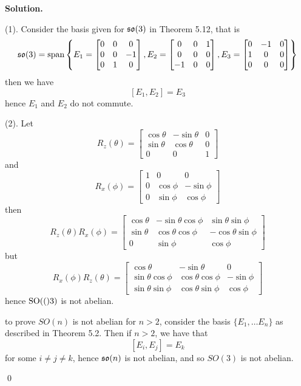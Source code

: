 \documentclass[12pt]{book}
\theoremstyle{definition}
\newenvironment{solution}
{%
  \par\noindent\textbf{Solution.}\quad
}
{%
  \qed\par
}
\begin{document}
\begin{solution}
  (1). Consider the basis given for $\mathfrak{so}(3)$ in Theorem 5.12, that is
  \[\mathfrak{so}(3) = \text{span} \left\{
    E_1 = \begin{bmatrix}
      0 & 0 & 0 \\
      0 & 0 & -1 \\
      0 & 1 & 0
      \end{bmatrix}, 
    E_2 = \begin{bmatrix}
      0 & 0 & 1 \\
      0 & 0 & 0 \\
      -1 & 0 & 0
      \end{bmatrix},
    E_3 = \begin{bmatrix}
      0 & -1 & 0 \\
      1 & 0 & 0 \\
      0 & 0 & 0
      \end{bmatrix} \right\}\]
  then we have 
  \[[E_1, E_2] = E_3\]
  hence $E_1$ and $E_2$ do not commute.

  (2). Let
  \[
    R_z(\theta) =
    \begin{bmatrix}
    \cos\theta & -\sin\theta & 0 \\
    \sin\theta & \cos\theta & 0 \\
    0 & 0 & 1
    \end{bmatrix}
  \]
  and 
  \[
    R_x(\phi) =
    \begin{bmatrix}
    1 & 0 & 0 \\
    0 & \cos\phi & -\sin\phi \\
    0 & \sin\phi & \cos\phi
    \end{bmatrix}
  \]
  then 
  \[
    R_z(\theta) R_x(\phi) =
    \begin{bmatrix}
    \cos\theta & -\sin\theta\cos\phi & \sin\theta\sin\phi \\
    \sin\theta & \cos\theta\cos\phi & -\cos\theta\sin\phi \\
    0 & \sin\phi & \cos\phi
    \end{bmatrix}
  \]
  but 
  \[
    R_x(\phi) R_z(\theta) =
    \begin{bmatrix}
    \cos\theta & -\sin\theta & 0 \\
    \sin\theta\cos\phi & \cos\theta\cos\phi & -\sin\phi \\
    \sin\theta\sin\phi & \cos\theta\sin\phi & \cos\phi
    \end{bmatrix}
  \]
  hence $\mathrm{SO}(()3)$ is not abelian.

  to prove $SO(n)$ is not abelian for $n > 2$, consider the basis $\{E_1, \dots E_n\}$ as described in Theorem 5.2.
  Then if $n >2$, we have that 
  \[[E_i, E_j] = E_k\]
  for some $i \neq j \neq k$, hence $\mathfrak{so}(n)$ is not abelian, and so $SO(3)$ is not abelian.

\end{solution}
\end{document}
